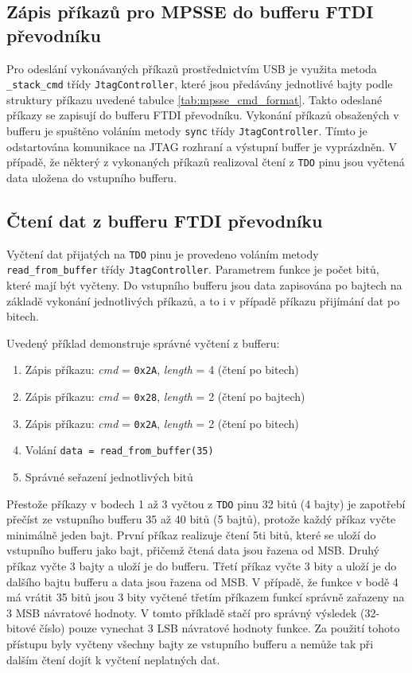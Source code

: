\subsection{Zápis příkazů pro \acs{MPSSE} do bufferu FTDI převodníku}
Pro odeslání vykonávaných příkazů prostřednictvím USB je využita metoda \texttt{\_stack\_cmd} třídy \texttt{JtagController}, které jsou předávány jednotlivé bajty podle struktury příkazu uvedené tabulce \ref{tab:mpsse_cmd_format}. Takto odeslané příkazy se zapisují do bufferu FTDI převodníku. Vykonání příkazů obsažených v bufferu je spuštěno voláním metody \texttt{sync} třídy \texttt{JtagController}. Tímto je odstartována komunikace na \acs{JTAG} rozhraní a výstupní buffer je vyprázdněn. V případě, že některý z vykonaných příkazů realizoval čtení z \texttt{\acs{TDO}} pinu jsou vyčtená data uložena do vstupního bufferu. \cite{PyFtdi} \cite{PyFtdi_doc}

\subsection{Čtení dat z bufferu FTDI převodníku}
Vyčtení dat přijatých na \texttt{\acs{TDO}} pinu je provedeno voláním metody \texttt{read\_from\_buffer} třídy \texttt{JtagController}. Parametrem funkce je počet bitů, které mají být vyčteny. Do vstupního bufferu jsou data zapisována po bajtech na základě vykonání jednotlivých příkazů, a to i v případě příkazu přijímání dat po bitech. \cite{PyFtdi} \cite{PyFtdi_doc}

Uvedený příklad demonstruje správné vyčtení z bufferu:
\begin{enumerate}[leftmargin = 2cm]
	\item Zápis příkazu: \textit{cmd} = \texttt{0x2A}, \textit{length} = 4 (čtení po bitech)
	\item Zápis příkazu: \textit{cmd} = \texttt{0x28}, \textit{length} = 2 (čtení po bajtech)
	\item Zápis příkazu: \textit{cmd} = \texttt{0x2A}, \textit{length} = 2 (čtení po bitech)
	\item Volání \texttt{data = read\_from\_buffer(35)}
	\item Správné seřazení jednotlivých bitů
\end{enumerate}

Přestože příkazy v bodech 1 až 3 vyčtou z \texttt{\acs{TDO}} pinu 32 bitů (4 bajty) je zapotřebí přečíst ze vstupního bufferu 35 až 40 bitů (5 bajtů), protože každý příkaz vyčte minimálně jeden bajt. První příkaz realizuje čtení 5ti bitů, které se uloží do vstupního bufferu jako bajt, přičemž čtená data jsou řazena od \acs{MSB}. Druhý příkaz vyčte 3 bajty a uloží je do bufferu. Třetí příkaz vyčte 3 bity a uloží je do dalšího bajtu bufferu a data jsou řazena od \acs{MSB}. V případě, že funkce v bodě 4 má vrátit 35 bitů jsou 3 bity vyčtené třetím příkazem funkcí správně zařazeny na 3 \acs{MSB} návratové hodnoty. V tomto příkladě stačí pro správný výsledek (32-bitové číslo) pouze vynechat 3 \acs{LSB} návratové hodnoty funkce. Za použití tohoto přístupu byly vyčteny všechny bajty ze vstupního bufferu a nemůže tak při dalším čtení dojít k vyčtení neplatných dat.

